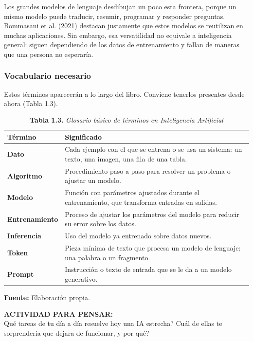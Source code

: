 Los grandes modelos de lenguaje desdibujan un poco esta frontera, porque un mismo modelo puede traducir, resumir, programar y responder preguntas. Bommasani et al. (2021) destacan justamente que estos modelos se reutilizan en muchas aplicaciones. Sin embargo, esa versatilidad no equivale a inteligencia general: siguen dependiendo de los datos de entrenamiento y fallan de maneras que una persona no esperaría.

\subsubsection{Vocabulario necesario}
Estos términos aparecerán a lo largo del libro. Conviene tenerlos presentes desde ahora (Tabla 1.3).

\begin{table}[htpb!]
\centering
\small\sffamily
\caption{\textbf{Tabla 1.3.} \textit{Glosario básico de términos en Inteligencia Artificial}}
\vspace{0.15cm}
\begin{tabularx}{\textwidth}{>{\bfseries}p{2.8cm} >{\raggedright\arraybackslash}X}
\toprule
Término & Significado \\
\midrule
Dato & Cada ejemplo con el que se entrena o se usa un sistema: un texto, una imagen, una fila de una tabla. \\
\midrule
Algoritmo & Procedimiento paso a paso para resolver un problema o ajustar un modelo. \\
\midrule
Modelo & Función con parámetros ajustados durante el entrenamiento, que transforma entradas en salidas. \\
\midrule
Entrenamiento & Proceso de ajustar los parámetros del modelo para reducir su error sobre los datos. \\
\midrule
Inferencia & Uso del modelo ya entrenado sobre datos nuevos. \\
\midrule
Token & Pieza mínima de texto que procesa un modelo de lenguaje: una palabra o un fragmento. \\
\midrule
Prompt & Instrucción o texto de entrada que se le da a un modelo generativo. \\
\bottomrule
\end{tabularx}
\vspace{0.15cm}
\raggedright\scriptsize \textbf{Fuente:} Elaboración propia.
\end{table}

\begin{cajabeige}
\textbf{ACTIVIDAD PARA PENSAR:}\\
\textquestiondown Qué tareas de tu día a día resuelve hoy una IA estrecha? \textquestiondown Cuál de ellas te sorprendería que dejara de funcionar, y por qué?
\end{cajabeige}

